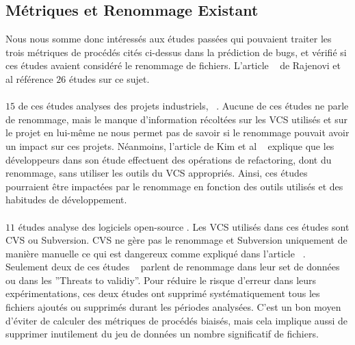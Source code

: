 \subsection{Métriques et Renommage Existant}
Nous nous somme donc intéressés aux études passées qui pouvaient traiter les trois métriques de procédés cités ci-dessus dans la prédiction de bugs, et vérifié si ces études avaient considéré le renommage de fichiers. L'article ~\cite{radjenovic_software_2013} de Rajenovi et al référence $26$ études sur ce sujet.\\\\
$15$ de ces études analyses des projets industriels, ~\cite{arisholm_systematic_2010,graves_predicting_2000,khoshgoftaar_using_2000,layman_iterative_2008,munson_code_1998,nagappan_use_2005,nagappan_influence_2008,nagappan_using_2007,nagappan_using_2006,nagappan_change_2010,nikora_building_2006,ostrand_programmer-based_2010,weyuker_too_2008,weyuker_using_2007,yuan_application_2000}. Aucune de ces études ne parle de renommage, mais le manque d'information récoltées sur les VCS utilisés et sur le projet en lui-même ne nous permet pas de savoir si le renommage pouvait avoir un impact sur ces projets. Néanmoins, l'article de Kim et al ~\cite{kim_field_2012} explique que les développeurs dans son étude effectuent des opérations de refactoring, dont du renommage, sans utiliser les outils du VCS appropriés. Ainsi, ces études pourraient être impactées par le renommage en fonction des outils utilisés et des habitudes de développement.\\\\ 

$11$ études analyse des logiciels open-source \cite{dambros_relationship_2009,bacchelli_are_2010,caglayan_merits_2009,dambros_evaluating_2012,dambros_evaluating_2012,dambros_extensive_2010,illes-seifert_exploring_2010,li_finding_2005,matsumoto_analysis_2010,moser_analysis_2008,moser_comparative_2008,schroter_if_2006}. Les VCS utilisés dans ces études sont CVS ou Subversion. CVS ne gère pas le renommage et Subversion uniquement de manière manuelle ce qui est dangereux comme expliqué dans l'article ~\cite{lavoie_inferring_2012,steidl_incremental_2014}. Seulement deux de ces études ~\cite{moser_analysis_2008,moser_comparative_2008} parlent de renommage dans leur set de données ou dans les ''Threats to validiy''. Pour réduire le risque d'erreur dans leurs expérimentations, ces deux études ont supprimé systématiquement tous les fichiers ajoutés ou supprimés durant les périodes analysées. C'est un bon moyen d'éviter de calculer des métriques de procédés biaisés, mais cela implique aussi de supprimer inutilement du jeu de données un nombre significatif de fichiers.\\

